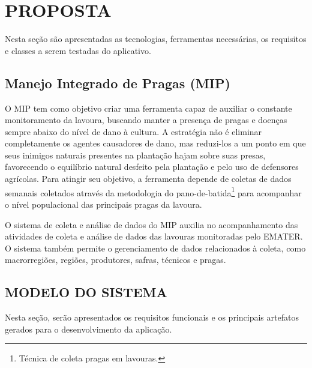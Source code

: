 
\chapter{PROPOSTA}
\label{chap:metodologia}

Nesta seção são apresentadas as tecnologias, ferramentas necessárias, os requisitos e  classes a serem testadas  do aplicativo.

\section{Manejo Integrado de Pragas (MIP)}
        
O MIP tem como objetivo criar uma ferramenta capaz de auxiliar o constante monitoramento da lavoura, buscando manter a presença de pragas e doenças sempre abaixo do nível de dano à cultura. A estratégia não é eliminar completamente os agentes causadores de dano, mas reduzi-los a um ponto em que seus inimigos naturais presentes na plantação hajam sobre suas presas, favorecendo o equilíbrio natural desfeito pela plantação e pelo uso de defensores agrícolas. Para atingir seu objetivo, a ferramenta depende de coletas de dados semanais coletados através da metodologia do pano-de-batida\footnote{Técnica de coleta pragas em lavouras.} para acompanhar o nível populacional das principais pragas da lavoura. 


O sistema de coleta e análise de dados do MIP auxilia no acompanhamento das atividades de coleta e análise de dados das lavouras monitoradas pelo EMATER. O sistema também permite o gerenciamento de dados relacionados à coleta, como macrorregiões, regiões, produtores, safras, técnicos e pragas. 




\section{MODELO DO SISTEMA}
Nesta seção, serão apresentados os requisitos funcionais e os principais artefatos gerados para o desenvolvimento da aplicação.

